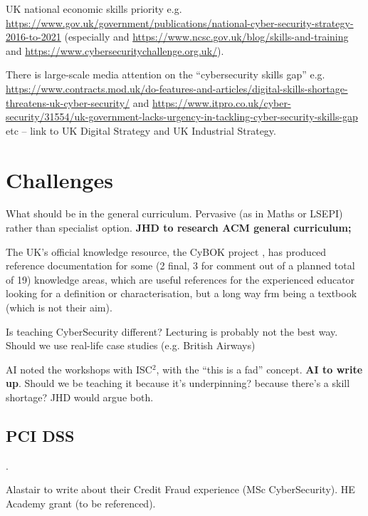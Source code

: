 \documentclass[sigconf,anonymous]{acmart}
\begin{document}
UK national economic skills priority
e.g. \url{https://www.gov.uk/government/publications/national-cyber-security-strategy-2016-to-2021}
(especially \cite{JCNSS2018a}
and \url{https://www.ncsc.gov.uk/blog/skills-and-training} and
\url{https://www.cybersecuritychallenge.org.uk/}). 

There is large-scale media
attention on the ``cybersecurity skills gap''
e.g. \url{https://www.contracts.mod.uk/do-features-and-articles/digital-skills-shortage-threatens-uk-cyber-security/}
and
\url{https://www.itpro.co.uk/cyber-security/31554/uk-government-lacks-urgency-in-tackling-cyber-security-skills-gap}
etc -- link to UK Digital Strategy and UK Industrial Strategy.

\section{Challenges}

What should be in the general curriculum.  Pervasive (as in Maths or LSEPI) rather than specialist option.  
{\bf JHD to research ACM general curriculum;}

The UK's official knowledge resource, the CyBOK project \cite{Bristol2019a}, has produced reference documentation for some (2 final, 3 for comment out of a planned total of 19) knowledge areas, which are useful references for the experienced educator looking for a definition or characterisation, but a long way frm being a textbook (which is not their aim).

Is teaching CyberSecurity different? Lecturing is probably not the best way. Should we use real-life case studies (e.g. British Airways)

AI noted the workshops with ISC$^2$, with the ``this is a fad'' concept.
{\bf AI to write up}.
  Should we be teaching it because it's underpinning? because there's a skill shortage?  JHD would argue both.


\subsection{PCI DSS}
\cite{PCI2018b}.

Alastair to write about their Credit Fraud experience (MSc CyberSecurity).
HE Academy grant (to be referenced).
\end{document}
